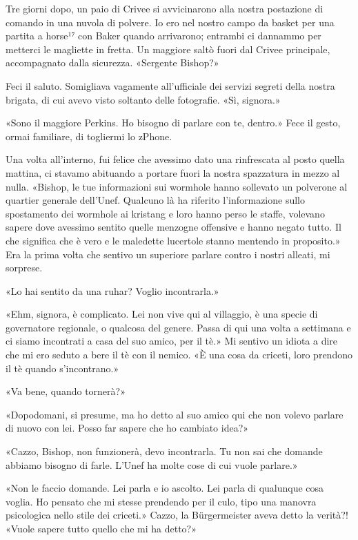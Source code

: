 \hfill\break

Tre giorni dopo, un paio di Crivee si avvicinarono alla nostra
postazione di comando in una nuvola di polvere. Io ero nel nostro campo
da basket per una partita a horse¹⁷ con Baker quando arrivarono;
entrambi ci dannammo per metterci le magliette in fretta. Un maggiore
saltò fuori dal Crivee principale, accompagnato dalla sicurezza.
«Sergente Bishop?»

Feci il saluto. Somigliava vagamente all'ufficiale dei servizi segreti
della nostra brigata, di cui avevo visto soltanto delle fotografie. «Sì,
signora.»

«Sono il maggiore Perkins. Ho bisogno di parlare con te, dentro.» Fece
il gesto, ormai familiare, di togliermi lo zPhone.

Una volta all'interno, fui felice che avessimo dato una rinfrescata al
posto quella mattina, ci stavamo abituando a portare fuori la nostra
spazzatura in mezzo al nulla. «Bishop, le tue informazioni sui wormhole
hanno sollevato un polverone al quartier generale dell'Unef. Qualcuno là
ha riferito l'informazione sullo spostamento dei wormhole ai kristang e
loro hanno perso le staffe, volevano sapere dove avessimo sentito quelle
menzogne offensive e hanno negato tutto. Il che significa che è vero e
le maledette lucertole stanno mentendo in proposito.» Era la prima volta
che sentivo un superiore parlare contro i nostri alleati, mi sorprese.

«Lo hai sentito da una ruhar? Voglio incontrarla.»

«Ehm, signora, è complicato. Lei non vive qui al villaggio, è una specie
di governatore regionale, o qualcosa del genere. Passa di qui una volta
a settimana e ci siamo incontrati a casa del suo amico, per il tè.» Mi
sentivo un idiota a dire che mi ero seduto a bere il tè con il nemico.
«È una cosa da criceti, loro prendono il tè quando s'incontrano.»

«Va bene, quando tornerà?»

«Dopodomani, si presume, ma ho detto al suo amico qui che non volevo
parlare di nuovo con lei. Posso far sapere che ho cambiato idea?»

«Cazzo, Bishop, non funzionerà, devo incontrarla. Tu non sai che domande
abbiamo bisogno di farle. L'Unef ha molte cose di cui vuole parlare.»

«Non le faccio domande. Lei parla e io ascolto. Lei parla di qualunque
cosa voglia. Ho pensato che mi stesse prendendo per il culo, tipo una
manovra psicologica nello stile dei criceti.» Cazzo, la Bürgermeister
aveva detto la verità?! «Vuole sapere tutto quello che mi ha detto?»


